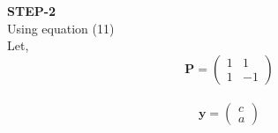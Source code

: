 \documentclass[10pt,a4paper]{report}
\let\vec\mathbf
\begin{document}
\begin{multicols}{2}
\textbf{STEP-2}\vspace{2mm}\\
Using equation (11) \vspace{2mm}\\
 Let,
\begin{equation}
\vec{P} =\begin{pmatrix}
1 & 1\\
1 &-1
\end{pmatrix} 
\end{equation} \\ \vspace{2mm}
\begin{equation}
  \vec{y} =\begin{pmatrix}
c \\
a
\end{pmatrix} 
\end{equation}  \vspace{2mm}


\end{multicols}
\end{document}
